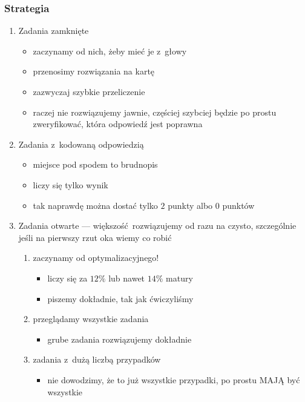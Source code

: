 \subsubsection*{Strategia}
\begin{enumerate}
    \item Zadania zamknięte
        \begin{itemize}
            \item zaczynamy od nich, żeby mieć je z~głowy
            \item przenosimy rozwiązania na kartę
            \item zazwyczaj szybkie przeliczenie
            \item raczej nie rozwiązujemy jawnie, częściej szybciej będzie po prostu zweryfikować, która odpowiedź jest poprawna
        \end{itemize}
    \item Zadania z~kodowaną odpowiedzią
        \begin{itemize}
            \item miejsce pod spodem to brudnopis
            \item liczy się tylko wynik
            \item tak naprawdę można dostać tylko \(2\) punkty albo \(0\) punktów
        \end{itemize}
    \item Zadania otwarte --- większość rozwiązujemy od razu na czysto, szczególnie jeśli na pierwszy rzut oka wiemy co robić
        \begin{enumerate}[label={\Roman*)}]
            \item zaczynamy od optymalizacyjnego!
                \begin{itemize}
                    \item liczy się za \(12\%\) lub nawet \(14\%\) matury
                    \item piszemy dokładnie, tak jak ćwiczyliśmy
                \end{itemize}
            \item przeglądamy wszystkie zadania
                \begin{itemize}
                    \item grube zadania rozwiązujemy dokładnie
                \end{itemize}
            \item zadania z~dużą liczbą przypadków
                \begin{itemize}
                    \item nie dowodzimy, że to już wszystkie przypadki, po prostu MAJĄ być wszystkie

\end{itemize}
\end{enumerate}
\end{enumerate}

